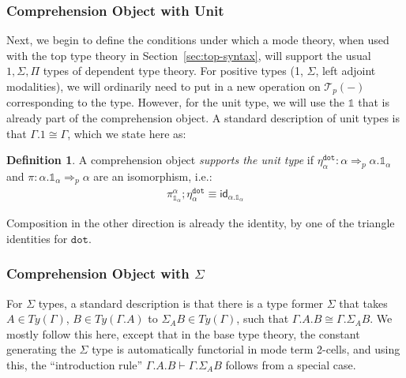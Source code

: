 \documentclass[10pt]{article}
\theoremstyle{definition}
\newtheorem{definition}{Definition}
\newcommand{\tcell}{\Rightarrow}
\newcommand{\id}{\mathsf{id}}
\newcommand\El[2]{\mathcal{T}_{#1}(#2)}
\newcommand{\tdot}{\ensuremath{\mathtt{dot}}}
\newcommand\One{\ensuremath{\mathds{1}}}
\begin{document}
\subsubsection{Comprehension Object with Unit}

Next, we begin to define the conditions under which a mode theory, when
used with the top type theory in Section~\ref{sec:top-syntax}, will
support the usual $1, \Sigma, \Pi$ types of dependent type theory.  For
positive types (1, $\Sigma$, left adjoint modalities), we will
ordinarily need to put in a new operation on $\El{p}{-}$ corresponding
to the type.  However, for the unit type, we will use the $\One$ that is
already part of the comprehension object.  A standard description of
unit types is that $\Gamma.1 \cong \Gamma$, which we state here as:
\begin{definition}\label{def:supports-unit}
A comprehension object \emph{supports the unit type} if
$\eta^\tdot_\alpha : \alpha \tcell_p \alpha.\One_\alpha$ and $\pi :
\alpha.\One_\alpha \tcell_p \alpha$ are an isomorphism, i.e.:
\begin{align}
\pi^\alpha_{\One_\alpha} ; \eta^\tdot_\alpha \equiv \id_{\alpha.\One_\alpha}
\end{align}
\end{definition}
Composition in the other direction is already the identity, by one of the triangle identities for $\tdot$.

\subsubsection{Comprehension Object with $\Sigma$}

For $\Sigma$ types, a standard description is that there is a type
former $\Sigma$ that takes $A \in Ty(\Gamma)$, $B \in Ty(\Gamma.A)$ to
$\Sigma_A B \in Ty(\Gamma)$, such that $\Gamma.A.B \cong \Gamma.\Sigma_A
B$.  We mostly follow this here, except that in the base type theory,
the constant generating the $\Sigma$ type is automatically functorial in
mode term 2-cells, and using this, the ``introduction rule''
$\Gamma.A.B \vdash \Gamma.\Sigma_A B$ follows from a special case.
\end{document}
